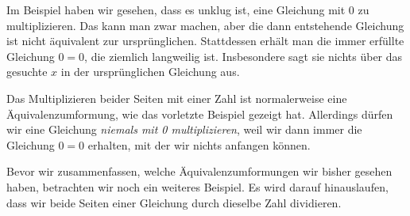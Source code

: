 \documentclass[../../main.tex]{subfiles}
\begin{document}
Im Beispiel haben wir gesehen, dass es unklug ist, eine Gleichung mit 0 zu multiplizieren. Das kann man zwar machen, aber die dann entstehende Gleichung ist nicht äquivalent zur ursprünglichen. Stattdessen erhält man die immer erfüllte Gleichung $0=0$, die ziemlich langweilig ist. Insbesondere sagt sie nichts über das gesuchte $x$ in der ursprünglichen Gleichung aus.

Das Multiplizieren beider Seiten mit einer Zahl ist normalerweise eine Äquivalenzumformung, wie das vorletzte Beispiel gezeigt hat. Allerdings dürfen wir eine Gleichung \emph{niemals mit 0 multiplizieren}, weil wir dann immer die Gleichung $0=0$ erhalten, mit der wir nichts anfangen können.

Bevor wir zusammenfassen, welche Äquivalenzumformungen wir bisher gesehen haben, betrachten wir noch ein weiteres Beispiel. Es wird darauf hinauslaufen, dass wir beide Seiten einer Gleichung durch dieselbe Zahl dividieren.
\end{document}
